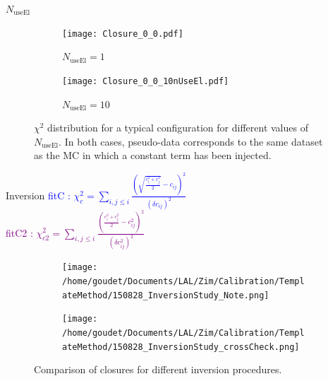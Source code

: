\begin{frame}{$N_\text{useEl}$}
  \begin{figure}
\begin{subfigure}[t]{0.49\linewidth}
\begin{center}
\texttt{[image: Closure\_0\_0.pdf]}
\end{center}
\caption{$N_\text{useEl}=1$}
\end{subfigure}
\begin{subfigure}[t]{0.49\linewidth}
\begin{center}
\texttt{[image: Closure\_0\_0\_10nUseEl.pdf]}
\end{center}
\caption{$N_\text{useEl}=10$}
\end{subfigure}
\caption{\label{org98e07ca}
$\chi^2$ distribution for a typical configuration for different values of $N_\text{useEl}$. In both cases, pseudo-data corresponds to the same dataset as the MC in which a constant term has been injected.}
\end{figure}
\end{frame}

\begin{frame}{Inversion}
  \centering
\textcolor{blue}{  fitC : $\chi_c^2 = \sum \limits_{i, j\leq i} \frac{ (\sqrt{\frac{c_i^2 + c_j^2}{2}} - c_{ij})^2 }{(\delta c_{ij})^2}$ } \\

  \textcolor{purple}{fitC2 : $\chi_{c2}^2 = \sum \limits_{i, j\leq i} \frac{ (\frac{c_i^2 + c_j^2}{2} - c_{ij}^2)^2 }{(\delta c_{ij}^2)^2}$}

  \begin{figure}
\begin{subfigure}[t]{0.49\linewidth}
\begin{center}
\texttt{[image: /home/goudet/Documents/LAL/Zim/Calibration/TemplateMethod/150828\_InversionStudy\_Note.png]}
\end{center}
\end{subfigure}
\begin{subfigure}[t]{0.49\linewidth}
\begin{center}
\texttt{[image: /home/goudet/Documents/LAL/Zim/Calibration/TemplateMethod/150828\_InversionStudy\_crossCheck.png]}
\end{center}
\end{subfigure}
\caption{\label{orgac9241c}
Comparison of closures for different inversion procedures.}
\end{figure}
\end{frame}
